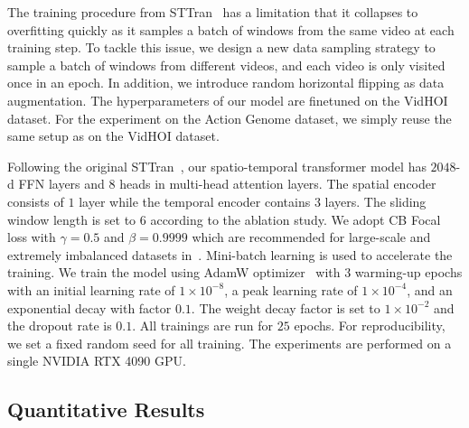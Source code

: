\documentclass[times,twocolumn,final,authoryear]{elsarticle}
\begin{document}
The training procedure from STTran~\citep{hoi_v2:sttran} has a limitation that it collapses to overfitting quickly as it samples a batch of windows from the same video at each training step. To tackle this issue, we design a new data sampling strategy to sample a batch of windows from different videos, and each video is only visited once in an epoch. In addition, we introduce random horizontal flipping as data augmentation. The hyperparameters of our model are finetuned on the VidHOI dataset. For the experiment on the Action Genome dataset, we simply reuse the same setup as on the VidHOI dataset. 

Following the original STTran~\citep{hoi_v2:sttran}, our spatio-temporal transformer model has $2048$-d FFN layers and $8$ heads in multi-head attention layers. The spatial encoder consists of $1$ layer while the temporal encoder contains $3$ layers. The sliding window length is set to $6$ according to the ablation study. We adopt CB Focal loss with $\gamma=0.5$ and $\beta=0.9999$ which are recommended for large-scale and extremely imbalanced datasets in~\citep{loss:cb}. Mini-batch learning is used to accelerate the training. We train the model using AdamW optimizer~\citep{optimizer:adamw} with $3$ warming-up epochs with an initial learning rate of $1 \times 10^{-8}$, a peak learning rate of $1 \times 10^{-4}$, and an exponential decay with factor $0.1$. The weight decay factor is set to $1 \times 10^{-2}$ and the dropout rate is $0.1$. All trainings are run for $25$ epochs. For reproducibility, we set a fixed random seed for all training. The experiments are performed on a single NVIDIA RTX 4090 GPU.

\subsection{Quantitative Results}
\end{document}
